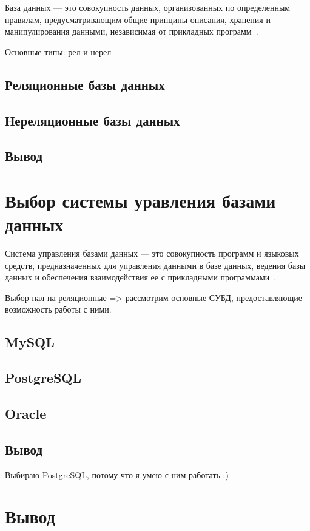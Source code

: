 База данных --- это совокупность данных, организованных по определенным
правилам, предусматривающим общие принципы описания, хранения и манипулирования
данными, независимая от прикладных программ~\cite{gost01}.

Основные типы: рел и нерел

\subsection{Реляционные базы данных}

\subsection{Нереляционные базы данных}

\subsection*{Вывод}

\section{Выбор системы уравления базами данных}

Система управления базами данных --- это совокупность программ и языковых
средств, предназначенных для управления данными в базе данных, ведения базы
данных и обеспечения взаимодействия ее с прикладными программами~\cite{gost01}.

Выбор пал на реляционные => рассмотрим основные СУБД, предоставляющие
возможность работы с ними.

\subsection{MySQL}

\subsection{PostgreSQL}

\subsection{Oracle}

\subsection*{Вывод}

Выбираю PostgreSQL, потому что я умею с ним работать :)

\section*{Вывод}
